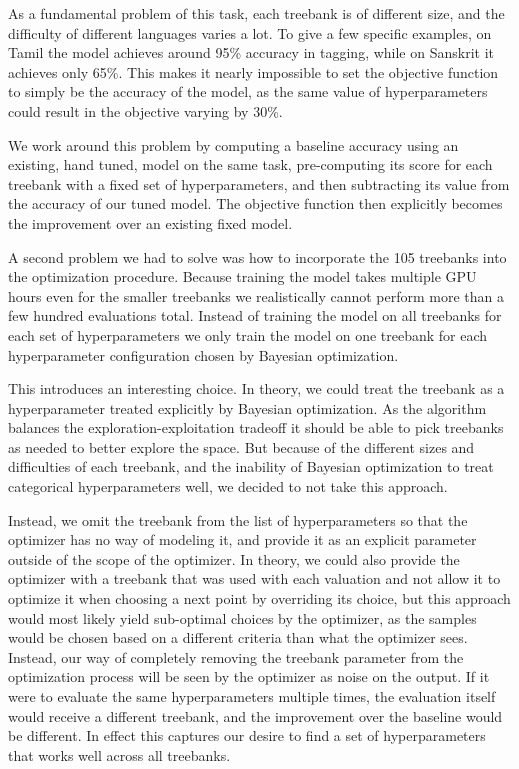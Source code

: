 As a fundamental problem of this task, each treebank is of different size, and the difficulty of different languages varies a lot. To give a few specific examples, on Tamil the model achieves around 95\% accuracy in tagging, while on Sanskrit it achieves only 65\%. This makes it nearly impossible to set the objective function to simply be the accuracy of the model, as the same value of hyperparameters could result in the objective varying by 30\%. 

We work around this problem by computing a baseline accuracy using an existing, hand tuned, model on the same task, pre-computing its score for each treebank with a fixed set of hyperparameters, and then subtracting its value from the accuracy of our tuned model. The objective function then explicitly becomes the improvement over an existing fixed model.

A second problem we had to solve was how to incorporate the 105 treebanks into the optimization procedure. Because training the model takes multiple GPU hours even for the smaller treebanks we realistically cannot perform more than a few hundred evaluations total. Instead of training the model on all treebanks for each set of hyperparameters we only train the model on one treebank for each hyperparameter configuration chosen by Bayesian optimization.

This introduces an interesting choice. In theory, we could treat the treebank as a hyperparameter treated explicitly by Bayesian optimization. As the algorithm balances the exploration-exploitation tradeoff it should be able to pick treebanks as needed to better explore the space. But because of the different sizes and difficulties of each treebank, and the inability of Bayesian optimization to treat categorical hyperparameters well, we decided to not take this approach.

Instead, we omit the treebank from the list of hyperparameters so that the optimizer has no way of modeling it, and provide it as an explicit parameter outside of the scope of the optimizer. In theory, we could also provide the optimizer with a treebank that was used with each valuation and not allow it to optimize it when choosing a next point by overriding its choice, but this approach would most likely yield sub-optimal choices by the optimizer, as the samples would be chosen based on a different criteria than what the optimizer sees. Instead, our way of completely removing the treebank parameter from the optimization process will be seen by the optimizer as noise on the output. If it were to evaluate the same hyperparameters multiple times, the evaluation itself would receive a different treebank, and the improvement over the baseline would be different. In effect this captures our desire to find a set of hyperparameters that works well across all treebanks.

